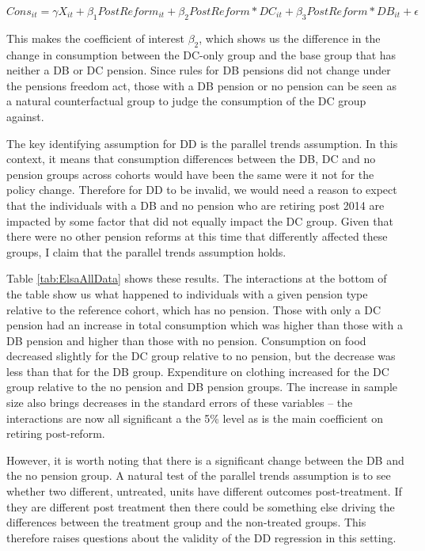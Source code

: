 \documentclass[12pt]{article}
\begin{document}
\begin{equation*}
    Cons_{it} =  \gamma X_{it} + \beta_{1} PostReform_{it} + \beta_{2} PostReform*DC_{it} + \beta_{3} PostReform*DB_{it}  + \epsilon
\end{equation*}


This makes the coefficient of interest $\beta_{2}$, which shows us the
difference in the change in consumption between the DC-only group and the base
group that has neither a DB or DC pension. Since rules for DB pensions did not
change under the pensions freedom act, those with a DB pension or no pension can
be seen as a natural counterfactual group to judge the consumption of the DC
group against.

The key identifying assumption for DD is the parallel trends assumption. In this
context, it means that consumption differences between the DB, DC and no pension
groups across cohorts would have been the same were it not for the policy change.
Therefore for DD to be invalid, we would need a reason to expect that the
individuals with a DB and no pension who are retiring post 2014 are impacted by
some factor that did not equally impact the DC group. Given that there were no
other pension reforms at this time that differently affected these groups, I
claim that the parallel trends assumption holds.

Table \ref{tab:ElsaAllData} shows these results. The interactions at the bottom
of the table show us what happened to individuals with a given pension type
relative to the reference cohort, which has no pension. Those with only a DC
pension had an increase in total consumption which was higher than those with a
DB pension and higher than those with no pension. Consumption on food decreased
slightly for the DC group relative to no pension, but the decrease was less than
that for the DB group. Expenditure on clothing increased for the DC group
relative to the no pension and DB pension groups. The increase in sample size
also brings decreases in the standard errors of these variables -- the
interactions are now all significant a the 5\% level as is the main coefficient
on retiring post-reform.

However, it is worth noting that there is a significant change between the DB
and the no pension group. A natural test of the parallel trends assumption is to
see whether two different, untreated, units have different outcomes
post-treatment. If they are different post treatment then there could be
something else driving the differences between the treatment group and the
non-treated groups. This therefore raises questions about the validity of the DD
regression in this setting.
\end{document}
